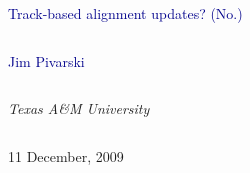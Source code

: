\documentclass[compress]{beamer}
\begin{document}
\begin{frame}
\vfill
\begin{center}
\textcolor{darkblue}{\Large Track-based alignment updates?  (No.)}

\vfill
\begin{columns}
\begin{center}
\large
\textcolor{darkblue}{Jim Pivarski}
\end{center}
\end{columns}

\begin{columns}
\begin{center}
\scriptsize
{\it Texas A\&M University}
\end{center}
\end{columns}

\vfill
11 December, 2009

\end{center}
\end{frame}


\small
\end{document}
